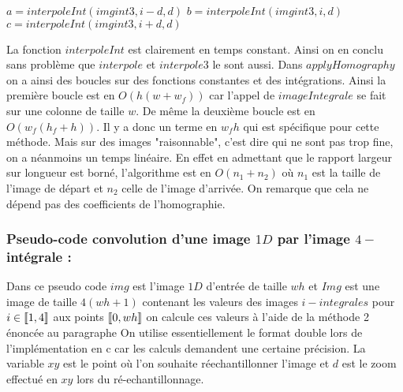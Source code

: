 \begin{algorithm}[H]
\caption{$interpoleTripleInt(imgint3,i,d)$}
$a=interpoleInt(imgint3,i-d,d)$\;
$b=interpoleInt(imgint3,i,d)$\;
$c=interpoleInt(imgint3,i+d,d)$\;
\end{algorithm}


La fonction $interpoleInt$ est clairement en temps constant. Ainsi on en conclu sans problème que $interpole$ et $interpole3$ le sont aussi. Dans $applyHomography$ on a ainsi des boucles sur des fonctions constantes et des intégrations. Ainsi la première boucle est en $O(h(w+w_f))$ car l'appel de $imageIntegrale$ se fait sur une colonne de taille $w$. De même la deuxième boucle est en $O(w_f(h_f+h))$. Il y a donc un terme en $w_f h$ qui est spécifique pour cette méthode. Mais sur des images "raisonnable", c'est dire qui ne sont pas trop fine, on a néanmoins un temps linéaire.
\medbreak
En effet en admettant que le rapport largeur sur longueur est borné, l'algorithme est en $O(n_1+n_2)$ où $n_1$ est la taille de l'image de départ et $n_2$ celle de l'image d'arrivée. On remarque que cela ne dépend pas des coefficients de l'homographie.

\subsubsection{Pseudo-code convolution d'une image $1D$ par l'image $4-$intégrale :}
 Dans ce pseudo code $img$ est l'image $1D$ d'entrée de taille $wh$ et $Img$ est une image de taille $4(wh+1)$ contenant les valeurs des images $i-integrales$ pour $i\in \llbracket 1,4 \rrbracket $ aux points $\llbracket 0,wh \rrbracket$ on calcule ces valeurs à l'aide de la méthode 2 énoncée au paragraphe 
 On utilise essentiellement le format double lors de l'implémentation en c car les calculs demandent une certaine précision. La variable $xy$ est le point où l'on souhaite réechantillonner l'image et $d$ est le zoom effectué en $xy$ lors du ré-echantillonnage.
 
 \begin{algorithm}
 \caption{$build4Integrale(img,Img)$}
 \end{algorithm}
 
